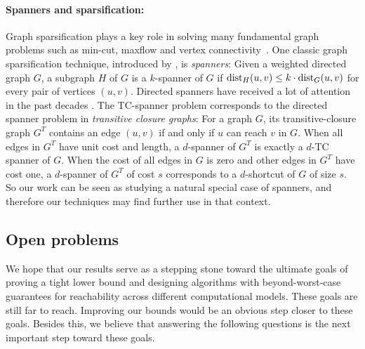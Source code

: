 \paragraph{Spanners and sparsification:} Graph sparsification plays a key role in solving many fundamental graph problems such as min-cut, maxflow and vertex connectivity~\cite{ChenKLPGS22,Cen0NPSQ21,Karger00}. One classic graph sparsification technique, introduced by \cite{PelegS89}, is {\em spanners}: Given a weighted directed graph $G$, a subgraph $H$ of $G$ is a $k$-spanner of $G$ if $\mathrm{dist}_{H}(u,v)\leq k\cdot\mathrm{dist}_G(u,v)$ for every pair of vertices $(u,v).$ Directed spanners have received a lot of attention in the past decades \cite{BhattacharyyaGJRW12,BermanBMRY11,ElkinP07,KoganP22,DinitzK11,DinitzKR16}. 
The TC-spanner problem  corresponds to the directed spanner problem in \textit{transitive closure graphs}: For a graph $G$, its transitive-closure graph $G^T$ contains an edge $(u,v)$ if and only if $u$ can reach $v$ in $G$. When  all edges in $G^T$ have unit cost and length, a $d$-spanner of $G^T$ is exactly a $d$-TC spanner of $G$. When the cost of all edges in $G$ is zero and other edges in $G^T$ have cost one, a $d$-spanner of $G^T$ of cost $s$ corresponds to a $d$-shortcut of $G$ of size $s$. 
So our work can be seen as studying a natural special case of spanners, and therefore our techniques may find further use in that context. 







\subsection{Open problems}
We hope that our results serve as a stepping stone toward the ultimate goals of proving a tight lower bound and designing algorithms with beyond-worst-case guarantees for reachability across different computational models. These goals are still far to reach. Improving our bounds would be an obvious step closer to these goals. Besides this, we believe that answering the following questions is the next important step toward these goals.

